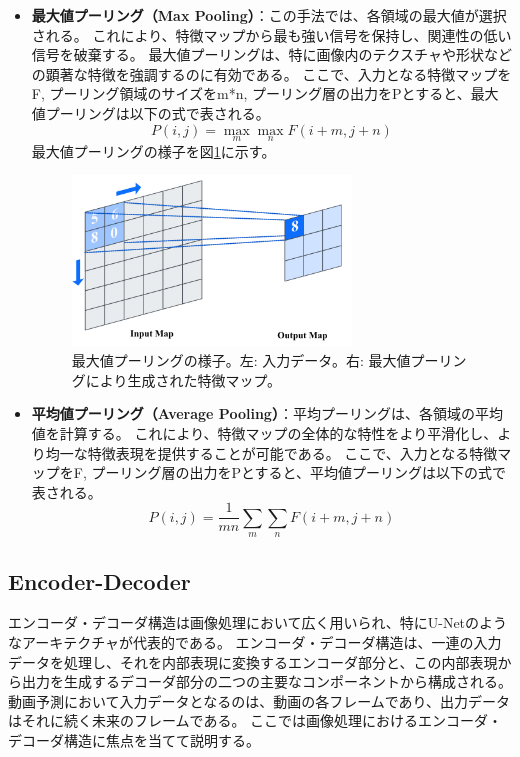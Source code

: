         \begin{itemize}
        \item \textbf{最大値プーリング（Max Pooling）}：この手法では、各領域の最大値が選択される。
        これにより、特徴マップから最も強い信号を保持し、関連性の低い信号を破棄する。
        最大値プーリングは、特に画像内のテクスチャや形状などの顕著な特徴を強調するのに有効である。
        ここで、入力となる特徴マップをF, プーリング領域のサイズをm*n, プーリング層の出力をPとすると、最大値プーリングは以下の式で表される。
        \begin{equation}
          P(i, j) = \max_{m}\max_{n}F(i+m, j+n)
        \end{equation}
        最大値プーリングの様子を図\ref{fig:maxpooling}に示す。
        \begin{figure}[htbp]
          \centering
          \includegraphics[width=0.7\textwidth]{figures/videoprediction/pooling.jpg}
          \caption{最大値プーリングの様子。左: 入力データ。右: 最大値プーリングにより生成された特徴マップ。}
          \label{fig:maxpooling}
        \end{figure}

        \item \textbf{平均値プーリング（Average Pooling）}：平均プーリングは、各領域の平均値を計算する。
        これにより、特徴マップの全体的な特性をより平滑化し、より均一な特徴表現を提供することが可能である。
        ここで、入力となる特徴マップをF, プーリング層の出力をPとすると、平均値プーリングは以下の式で表される。
        \begin{equation}
          P(i, j) = \frac{1}{mn}\sum_{m}\sum_{n}F(i+m, j+n)
        \end{equation}
        
        \end{itemize}
      

    \subsection{Encoder-Decoder}
      エンコーダ・デコーダ構造は画像処理において広く用いられ、特にU-Netのようなアーキテクチャが代表的である。
      エンコーダ・デコーダ構造は、一連の入力データを処理し、それを内部表現に変換するエンコーダ部分と、この内部表現から出力を生成するデコーダ部分の二つの主要なコンポーネントから構成される。
      動画予測において入力データとなるのは、動画の各フレームであり、出力データはそれに続く未来のフレームである。
      ここでは画像処理におけるエンコーダ・デコーダ構造に焦点を当てて説明する。
        
